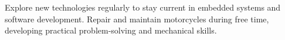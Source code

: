 

\begin{cventries}

  \cventry
    {} %
    {} %
    {} %
    {} %
    {
      \begin{cvitems}
        \item {Explore new technologies regularly to stay current in embedded systems and software development. Repair and maintain motorcycles during free time, developing practical problem-solving and mechanical skills.}
      \end{cvitems}
    }


\end{cventries}
